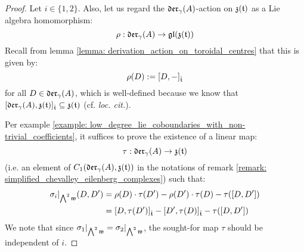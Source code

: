            \begin{proof}
                Let $i \in \{1, 2\}$. Also, let us regard the $\mathfrak{der}_{\gamma}(A)$-action on $\mathfrak{z}(\mathfrak{t})$ as a Lie algebra homomorphism:
                    $$\rho: \mathfrak{der}_{\gamma}(A) \to \mathfrak{gl}( \mathfrak{z}(\mathfrak{t}) )$$
                Recall from lemma \ref{lemma: derivation_action_on_toroidal_centres} that this is given by:
                    $$\rho(D) := [D, -]_{\hat{\mathfrak{t}}}$$
                for all $D \in \mathfrak{der}_{\gamma}(A)$, which is well-defined because we know that $[\mathfrak{der}_{\gamma}(A), \mathfrak{z}(\mathfrak{t})]_{\hat{\mathfrak{t}}} \subseteq \mathfrak{z}(\mathfrak{t})$ (cf. \textit{loc. cit.}).
            
                Per example \ref{example: low_degree_lie_coboundaries_with_non-trivial_coefficients}, it suffices to prove the existence of a linear map:
                    $$\tau: \mathfrak{der}_{\gamma}(A) \to \mathfrak{z}(\mathfrak{t})$$
                (i.e. an element of $C_1(\mathfrak{der}_{\gamma}(A), \mathfrak{z}(\mathfrak{t}))$ in the notations of remark \ref{remark: simplified_chevalley_eilenberg_complexes}) such that:
                    $$
                        \begin{aligned}
                            \sigma_i|_{\bigwedge^2 \mathfrak{w}}(D, D') & = \rho(D) \cdot \tau(D') - \rho(D') \cdot \tau(D) - \tau([D, D'])
                            \\
                            & = [D, \tau(D')]_{\hat{\mathfrak{t}}} - [D', \tau(D)]_{\hat{\mathfrak{t}}} - \tau([D, D'])
                        \end{aligned}
                    $$
                We note that since $\sigma_1|_{\bigwedge^2 \mathfrak{w}} = \sigma_2|_{\bigwedge^2 \mathfrak{w}}$, the sought-for map $\tau$ should be independent of $i$. 
                    

\end{proof}
